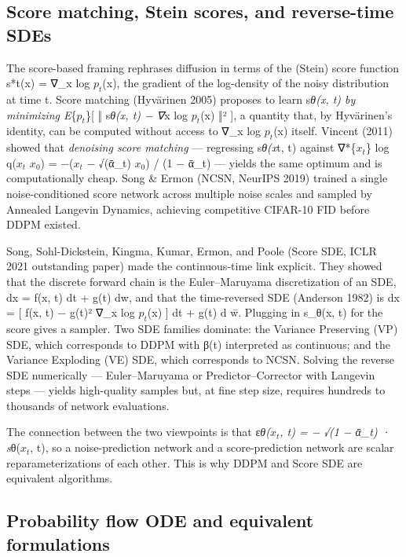 \subsection{Score matching, Stein scores, and reverse-time SDEs}\label{score-matching-stein-scores-and-reverse-time-sdes}

The score-based framing rephrases diffusion in terms of the (Stein) score function s*t(x) = ∇\_x log \(p_t\)(x), the gradient of the log-density of the noisy distribution at time t. Score matching (Hyvärinen 2005) proposes to learn s\emph{θ(x, t) by minimizing E}\{\(p_t\)\}{[} ‖ s\emph{θ(x, t) − ∇}x log \(p_t\)(x) ‖² {]}, a quantity that, by Hyvärinen's identity, can be computed without access to ∇\_x log \(p_t\)(x) itself. Vincent (2011) showed that \emph{denoising score matching} --- regressing s\emph{θ(x}t, t) against ∇*\{\(x_t\)\} log q(\(x_t\) \textbar{} \(x_0\)) = −(\(x_t\) − √(ᾱ\_t) \(x_0\)) / (1 − ᾱ\_t) --- yields the same optimum and is computationally cheap. Song \& Ermon (NCSN, NeurIPS 2019) trained a single noise-conditioned score network across multiple noise scales and sampled by Annealed Langevin Dynamics, achieving competitive CIFAR-10 FID before DDPM existed.

Song, Sohl-Dickstein, Kingma, Kumar, Ermon, and Poole (Score SDE, ICLR 2021 outstanding paper) made the continuous-time link explicit. They showed that the discrete forward chain is the Euler--Maruyama discretization of an SDE, dx = f(x, t) dt + g(t) dw, and that the time-reversed SDE (Anderson 1982) is dx = {[} f(x, t) − g(t)² ∇\_x log \(p_t\)(x) {]} dt + g(t) d w̄. Plugging in s\_θ(x, t) for the score gives a sampler. Two SDE families dominate: the Variance Preserving (VP) SDE, which corresponds to DDPM with β(t) interpreted as continuous; and the Variance Exploding (VE) SDE, which corresponds to NCSN. Solving the reverse SDE numerically --- Euler--Maruyama or Predictor--Corrector with Langevin steps --- yields high-quality samples but, at fine step size, requires hundreds to thousands of network evaluations.

The connection between the two viewpoints is that ε\emph{θ(\(x_t\), t) = − √(1 − ᾱ\_t) · s}θ(\(x_t\), t), so a noise-prediction network and a score-prediction network are scalar reparameterizations of each other. This is why DDPM and Score SDE are equivalent algorithms.

\subsection{Probability flow ODE and equivalent formulations}\label{probability-flow-ode-and-equivalent-formulations}

